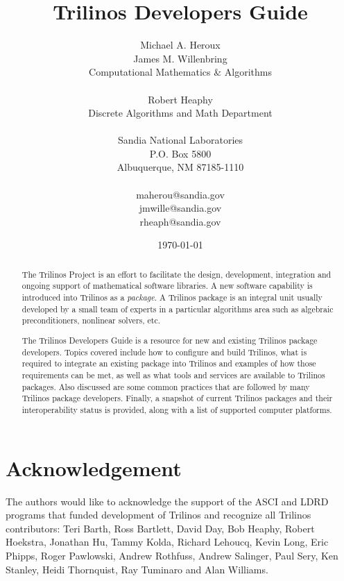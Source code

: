 \documentclass[12pt,strict]{TrilinosDevGuide}
\title{Trilinos Developers Guide}
\author{
Michael A. Heroux \\
James M. Willenbring\\
Computational Mathematics \& Algorithms \\
 \\
Robert Heaphy \\
Discrete Algorithms and Math Department \\
 \\
Sandia National Laboratories\\
P.O. Box 5800\\
Albuquerque, NM 87185-1110 \\
 \\
maherou@sandia.gov \\
jmwille@sandia.gov \\
rheaph@sandia.gov \\
}
\date{\today} %
\begin{document}
\maketitle
\setcounter{page}{3} %
\begin{abstract}

The Trilinos Project is an effort to facilitate the design, development,
integration and ongoing support of mathematical software libraries.
A new software capability is introduced into Trilinos as a {\it
package}.  A Trilinos package is an integral unit usually developed by
a small team of experts in a particular algorithms area such as
algebraic preconditioners, nonlinear solvers, etc.

The Trilinos Developers Guide is a resource for new and existing
Trilinos package developers.  Topics covered include how to configure and 
build Trilinos, what is required to integrate an existing package into Trilinos
and examples of how those requirements can be met, as well as what
tools and services are 
available to Trilinos packages.  Also discussed are some common practices that 
are followed by many Trilinos package developers.  Finally, a snapshot
of current Trilinos packages and their interoperability status
is provided, along with a list of supported computer platforms.

\end{abstract}


\section*{Acknowledgement}
The authors would like to acknowledge the support of the ASCI and LDRD 
programs that funded development of Trilinos and recognize all Trilinos 
contributors: Teri Barth, Ross Bartlett, David Day, Bob Heaphy, 
Robert Hoekstra, Jonathan Hu, Tammy Kolda, Richard Lehoucq, Kevin
Long, Eric Phipps, 
Roger Pawlowski, Andrew Rothfuss, Andrew Salinger, Paul Sery, Ken
Stanley, Heidi Thornquist, Ray Tuminaro and Alan Williams.

\clearpage
\tableofcontents
\listoffigures
\listoftables

\clearpage
\end{document}
